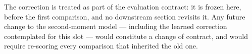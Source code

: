 The correction is treated as part of the evaluation contract: it is frozen
here, before the first comparison, and no downstream section revisits it.
Any future change to the second-moment model --- including the learned
correction contemplated for this slot --- would constitute a change of
contract, and would require re-scoring every comparison that inherited the
old one.

